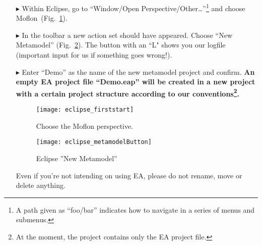 \begin{enumerate}
\item[$\blacktriangleright$] Within Eclipse, go to ``Window/Open Perspective/Other\ldots''\footnote{A path given as ``foo/bar'' indicates how to navigate in a series of menus and submenus.} and choose Moflon~(Fig.~\ref{fig_eclipse}). 

\item[$\blacktriangleright$] In the toolbar a new action set should have appeared. Choose ``New Metamodel'' (Fig.~\ref{fig_eclipseNewMetamodel}).
The button with an ``L" shows you our logfile (important input for us if something goes wrong!).
 
\item[$\blacktriangleright$] Enter ``Demo'' as the name of the new metamodel project and confirm. 
{\bf An empty EA project file ``Demo.eap'' will be created in a new project with a certain project structure according to our conventions\footnote{At the moment, the project contains only the EA project file.}.}

\clearpage
\texHeader
\mbox{}
\clearpage


\visHeader

\begin{figure}[htbp]
	\centering
  \texttt{[image: eclipse\_firststart]}
	\caption{Choose the Moflon perspective.}
	\label{fig_eclipse}
\end{figure}

\vspace{1cm}

\begin{figure}[htbp]
	\centering
  \texttt{[image: eclipse\_metamodelButton]}
	\caption{Eclipse ''New Metamodel''}
	\label{fig_eclipseNewMetamodel}
\end{figure}

\vspace{1cm}
Even if you're not intending on using EA, please do not rename, move or delete anything.


\end{enumerate}
